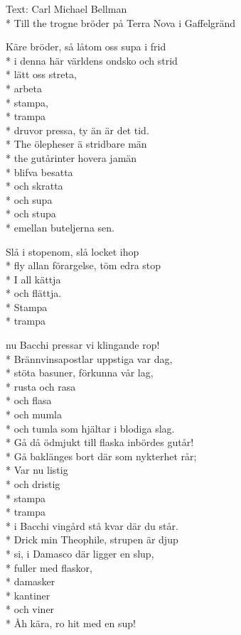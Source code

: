 \begin{SongText}
\begin{SongInfo}
    Text: Carl Michael Bellman\\*%
    Till the trogne bröder på Terra Nova i Gaffelgränd
\end{SongInfo}
\begin{SongVerse}
Käre bröder, så låtom oss supa i frid\\*%
i denna här världens ondsko och strid\\*%
lätt oss streta,\\*%
arbeta\\*%
stampa,\\*%
trampa\\*%
druvor pressa, ty än är det tid.\\*%
The ölepheser ä stridbare män\\*%
the gutårinter hovera jamän\\*%
blifva besatta\\*%
och skratta\\*%
och supa\\*%
och stupa\\*%
emellan buteljerna sen. 
\end{SongVerse}
\begin{SongVerse}
Slå i stopenom, slå locket ihop\\*%
fly allan förargelse, töm edra stop\\*%
I all kättja\\*%
och flättja.\\*%
Stampa\\*%
trampa
\end{SongVerse}
\begin{SongVerse}
nu Bacchi pressar vi klingande rop!\\*%
Brännvinsapostlar uppstiga var dag,\\*%
stöta basuner, förkunna vår lag,\\*%
rusta och rasa\\*%
och flasa\\*%
och mumla\\*%
och tumla som hjältar i blodiga slag.\\*%
Gå då ödmjukt till flaska inbördes gutår!\\*%
Gå baklänges bort där som nykterhet rår;\\*%
Var nu listig\\*%
och dristig\\*%
stampa\\*%
trampa\\*%
i Bacchi vingård stå kvar där du står.\\*%
Drick min Theophile, strupen är djup\\*%
si, i Damasco där ligger en slup,\\*%
fuller med flaskor,\\*%
damasker\\*%
kantiner\\*%
och viner\\*%
Åh kära, ro hit med en sup! 
\end{SongVerse}
\end{SongText}
